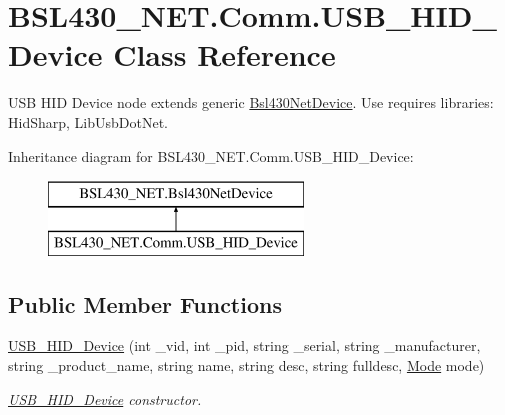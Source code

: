 \hypertarget{class_b_s_l430___n_e_t_1_1_comm_1_1_u_s_b___h_i_d___device}{}\section{B\+S\+L430\+\_\+\+N\+E\+T.\+Comm.\+U\+S\+B\+\_\+\+H\+I\+D\+\_\+\+Device Class Reference}
\label{class_b_s_l430___n_e_t_1_1_comm_1_1_u_s_b___h_i_d___device}


U\+SB H\+ID Device node extends generic \mbox{\hyperlink{class_b_s_l430___n_e_t_1_1_bsl430_net_device}{Bsl430\+Net\+Device}}. Use requires libraries\+: Hid\+Sharp, Lib\+Usb\+Dot\+Net.  


Inheritance diagram for B\+S\+L430\+\_\+\+N\+E\+T.\+Comm.\+U\+S\+B\+\_\+\+H\+I\+D\+\_\+\+Device\+:\begin{figure}[H]
\begin{center}
\leavevmode
\includegraphics[height=2.000000cm]{class_b_s_l430___n_e_t_1_1_comm_1_1_u_s_b___h_i_d___device}
\end{center}
\end{figure}
\subsection*{Public Member Functions}
\begin{DoxyCompactItemize}
\item 
\mbox{\hyperlink{class_b_s_l430___n_e_t_1_1_comm_1_1_u_s_b___h_i_d___device_a64b6796688cc224acf3a01cbdeb3ada2}{U\+S\+B\+\_\+\+H\+I\+D\+\_\+\+Device}} (int \+\_\+vid, int \+\_\+pid, string \+\_\+serial, string \+\_\+manufacturer, string \+\_\+product\+\_\+name, string name, string desc, string fulldesc, \mbox{\hyperlink{namespace_b_s_l430___n_e_t_aa1c6981cb6f279b5491d861ca555a1d7}{Mode}} mode)
\begin{DoxyCompactList}\small\item\em \mbox{\hyperlink{class_b_s_l430___n_e_t_1_1_comm_1_1_u_s_b___h_i_d___device}{U\+S\+B\+\_\+\+H\+I\+D\+\_\+\+Device}} constructor. \end{DoxyCompactList}\end{DoxyCompactItemize}

